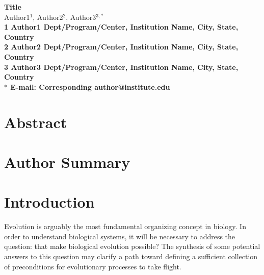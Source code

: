 \documentclass[10pt]{article}
\date{}
\begin{document}
\begin{flushleft}
{\Large
\textbf{Title}
}
\\
Author1$^{1}$, 
Author2$^{2}$, 
Author3$^{3,\ast}$
\\
\bf{1} Author1 Dept/Program/Center, Institution Name, City, State, Country
\\
\bf{2} Author2 Dept/Program/Center, Institution Name, City, State, Country
\\
\bf{3} Author3 Dept/Program/Center, Institution Name, City, State, Country
\\
$\ast$ E-mail: Corresponding author@institute.edu
\end{flushleft}

\listoftodos

\section*{Abstract}

\section*{Author Summary}



\section*{Introduction}
Evolution is arguably the most fundamental organizing concept in biology. In order to understand biological systems, it will be necessary to address the question: that make biological evolution possible? The synthesis of some potential answers to this question may clarify a path toward defining a sufficient collection of preconditions for evolutionary processes to take flight.
\end{document}

